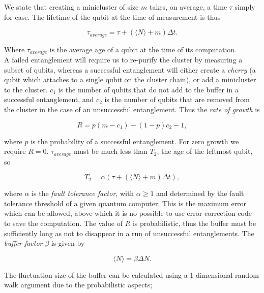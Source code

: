 \documentclass{article}
\numberwithin{equation}{section} %
\begin{document}
  We state that creating a minicluster of size $m$ takes, on average, a time $\tau$ simply for ease. The lifetime of the qubit at the time of measurement is thus 
 
\begin{equation}
\tau_{average}=\tau +(\langle N \rangle+m)\Delta t. 
\end{equation}
            
 Where $\tau_{average}$ is the average age of a qubit at the time of its computation. \\

   A failed entanglement will require us to re-purify the cluster by measuring a subset of qubits, whereas a successful entanglement will either create a \emph{cherry} (a qubit which attaches to a single qubit on the cluster chain), or add a minicluster to the cluster. $c_1$ is the number of qubits that do not add to the buffer in a successful entanglement, and $c_2$ is the number of qubits that are removed from the cluster in the case of an unsuccessful entanglement. Thus the \emph{rate of growth} is 

\begin{equation}
R=p(m-c_1)-(1-p)c_2-1, %
\end{equation}

where $p$ is the probability of a successful entanglement. For zero growth we require $R=0$. $\tau_{average}$ must be much less than $T_2$, the age of the leftmost qubit, so 

\begin{equation}
T_2=\alpha (\tau +(\langle N \rangle +m)\Delta t), %
\end{equation}

where $\alpha$ is the \emph{fault tolerance factor}, with $\alpha \geq 1$ and determined by the fault tolerance threshold of a given quantum computer. This is the maximum error which can be allowed, above which it is no possible to use error correction code to save the computation. The value of $R$ is probabilistic, thus the buffer must be sufficiently long as not to disappear in a run of unsuccessful entanglements. The \emph{buffer factor} $\beta$ is given by

\begin{equation}
\langle N \rangle=\beta \Delta N. %
\end{equation}

  The fluctuation size of the buffer can be calculated using a 1 dimensional random walk argument due to the probabilistic aspects;
\end{document}
